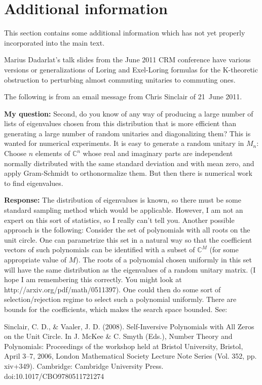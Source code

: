 \documentclass[10pt]{amsart}
\theoremstyle{definition}
\newcommand{\C}{{\mathbb{C}}}
\begin{document}
\section{Additional information}\label{Sec:Add}

\indent
This section contains
some additional information which has
not yet properly incorporated into the main text.

Marius
Dadarlat's talk slides from the June 2011 CRM conference have various
versions or generalizations of Loring and Exel-Loring formulas for the
K-theoretic obstruction to perturbing almost commuting unitaries to
commuting ones.

\vspace{1ex}

The following is from an email message from Chris Sinclair
of 21~June 2011.

{\textbf{My question:}}
Second, do you know of any way of producing a large number
of lists of eigenvalues chosen from this distribution that is
more efficient than generating a large number of random unitaries
and diagonalizing them? This is wanted for numerical experiments.
It is easy to generate a random unitary in $M_n$: Choose $n$ elements
of $\C^n$ whose real and imaginary parts are independent normally
distributed with the same standard deviation and with mean zero,
and apply Gram-Schmidt to orthonormalize them. But then there is
numerical work to find eigenvalues.

{\textbf{Response:}}
The distribution of eigenvalues is known, so there must be some standard
sampling method which would be applicable.  However, I am not an expert
on this sort of statistics, so I really can't tell you.  Another
possible approach is the following:  Consider the set of polynomials
with all roots on the unit circle.  One can parametrize this set in a
natural way so that the coefficient vectors of such polynomials can be
identified with a subset of $\C^M$
(for some appropriate value of $M$).  The
roots of a polynomial chosen uniformly in this set will have the same
distribution as the eigenvalues of a random unitary matrix.  (I hope I
am remembering this correctly.  You might look at
http://arxiv.org/pdf/math/0511397).  One could then do some sort of
selection/rejection regime to select such a polynomial uniformly.  There
are bounds for the coefficients, which makes the search space bounded. 
See:

Sinclair, C. D., \& Vaaler, J. D. (2008).
Self-Inversive Polynomials with
All Zeros on the Unit Circle. In J. McKee \& C. Smyth (Eds.), Number
Theory and Polynomials: Proceedings of the workshop held at {B}ristol
{U}niversity, {B}ristol, {A}pril 3--7, 2006, London Mathematical Society
Lecture Note Series (Vol. 352, pp. xiv+349). Cambridge: Cambridge
University Press. doi:10.1017/CBO9780511721274
\end{document}
